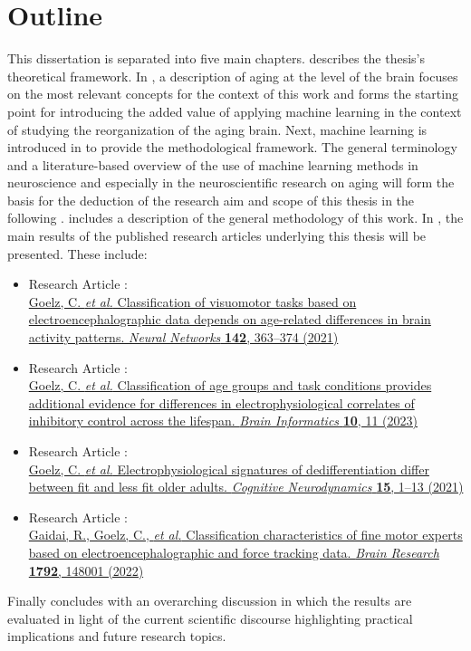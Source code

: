 \section{Outline}
This dissertation is separated into five main chapters.  describes the thesis's theoretical framework. In , a description of aging at the level of the brain focuses on the most relevant concepts for the context of this work and forms the starting point for introducing the added value of applying machine learning in the context of studying the reorganization of the aging brain. Next, machine learning is introduced in  to provide the methodological framework. The general terminology and a literature-based overview of the use of machine learning methods in neuroscience and especially in the neuroscientific research on aging will form the basis for the deduction of the research aim and scope of this thesis in the following .  includes a description of the general methodology of this work. In , the main results of the published research articles underlying this thesis will be presented. These include:

\begin{itemize}
\item Research Article :\\ \hyperref[pub:paperI]{Goelz, C. \textit{et al.} Classification of visuomotor tasks based on electroencephalographic data depends on age-related differences in brain activity patterns. \textit{Neural Networks} \textbf{142}, 363--374 (2021)}
\newpage
\item Research Article :\\ \hyperref[pub:paperI]{Goelz, C. \textit{et al.} Classification of age groups and task conditions provides additional evidence for differences in electrophysiological correlates of inhibitory control across the lifespan. \textit{Brain Informatics} \textbf{10}, 11 (2023)}
\item Research Article :\\ \hyperref[pub:paperI]{Goelz, C. \textit{et al.} Electrophysiological signatures of dedifferentiation differ between fit and less fit older adults. \textit{Cognitive Neurodynamics} \textbf{15}, 1--13 (2021)}
\item Research Article :\\ \hyperref[pub:paperIV]{Gaidai, R., Goelz, C., \textit{et al.} Classification characteristics of fine motor experts based on electroencephalographic and force tracking data. \textit{Brain Research} \textbf{1792}, 148001 (2022)}
\end{itemize}

\noindent Finally  concludes with an overarching discussion in which the results are evaluated in light of the current scientific discourse highlighting practical implications and future research topics. 
